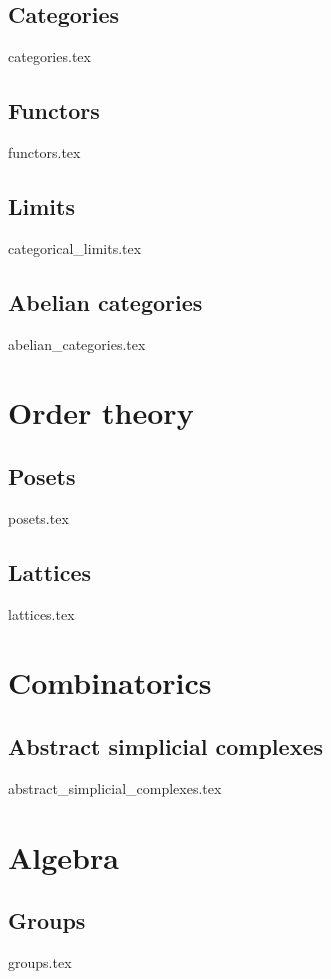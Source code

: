 \documentclass[numbers=endperiod, bibliography=totocnumbered]{scrartcl}
\begin{document}
\subsection{Categories}\label{sec:categories}
{categories.tex}
\subsection{Functors}\label{sec:functors}
{functors.tex}
\subsection{Limits}\label{sec:categorical_limits}
{categorical_limits.tex}
\subsection{Abelian categories}\label{sec:abelian_categories}
{abelian_categories.tex}

\section{Order theory}\label{sec:order_theory}
\subsection{Posets}\label{sec:posets}
{posets.tex}
\subsection{Lattices}\label{sec:lattices}
{lattices.tex}

\section{Combinatorics}\label{sec:combinatorics}
\subsection{Abstract simplicial complexes}\label{sec:abstract_simplicial_complexes}
{abstract_simplicial_complexes.tex}

\section{Algebra}\label{sec:algebra}
\subsection{Groups}\label{sec:groups}
{groups.tex}
\end{document}
